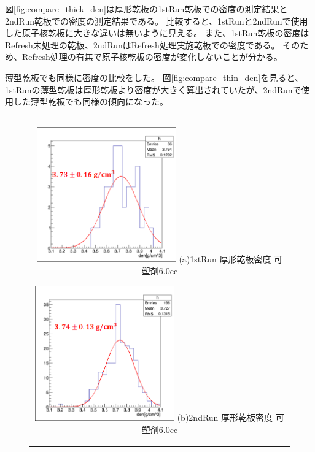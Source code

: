 \documentclass[12pt,a4paper]{jarticle}
\begin{document}
図\ref{fig:compare_thick_den}は厚形乾板の1stRun乾板での密度の測定結果と2ndRun乾板での密度の測定結果である。
比較すると、1stRunと2ndRunで使用した原子核乾板に大きな違いは無いように見える。
また、1stRun乾板の密度はRefresh未処理の乾板、2ndRunはRefresh処理実施乾板での密度である。
そのため、Refresh処理の有無で原子核乾板の密度が変化しないことが分かる。
\par
薄型乾板でも同様に密度の比較をした。
図\ref{fig:compare_thin_den}を見ると、1stRunの薄型乾板は厚形乾板より密度が大きく算出されていたが、2ndRunで使用した薄型乾板でも同様の傾向になった。
\begin{figure}[htbp]
    \begin{center}
      \begin{tabular}{c}
        \begin{minipage}{0.5\hsize}
          \begin{center}
            \includegraphics[clip, width=60mm]{1stRun_thin_den.png}
            \hspace{1.6cm} (a)1stRun 厚形乾板密度 可塑剤6.0cc
          \end{center}
        \end{minipage}
        
        \begin{minipage}{0.5\hsize}
          \begin{center}
            \includegraphics[clip, width=60mm]{2ndRun_thin_den.png}
            \hspace{1.6cm} (b)2ndRun 厚形乾板密度 可塑剤6.0cc
          \end{center}
        \end{minipage}\\


\end{tabular}
\end{center}
\end{figure}
\end{document}
